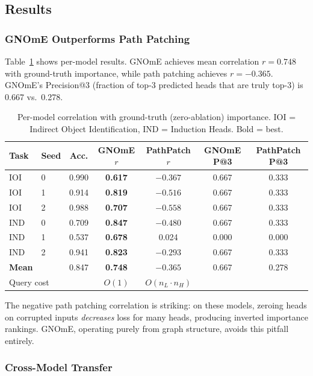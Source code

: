 \documentclass[11pt]{article}
\begin{document}
\subsection{Results}

\subsubsection{GNOmE Outperforms Path Patching}

Table~\ref{tab:main} shows per-model results. GNOmE achieves mean correlation $r = 0.748$ with ground-truth importance, while path patching achieves $r = -0.365$. GNOmE's Precision@3 (fraction of top-3 predicted heads that are truly top-3) is 0.667 vs.\ 0.278.

\begin{table}[t]
\centering
\caption{Per-model correlation with ground-truth (zero-ablation) importance. IOI = Indirect Object Identification, IND = Induction Heads. Bold = best.}
\label{tab:main}
\begin{tabular}{llccccc}
\toprule
Task & Seed & Acc. & GNOmE $r$ & PathPatch $r$ & GNOmE P@3 & PathPatch P@3 \\
\midrule
IOI & 0 & 0.990 & \textbf{0.617} & $-0.367$ & 0.667 & 0.333 \\
IOI & 1 & 0.914 & \textbf{0.819} & $-0.516$ & 0.667 & 0.333 \\
IOI & 2 & 0.988 & \textbf{0.707} & $-0.558$ & 0.667 & 0.333 \\
IND & 0 & 0.709 & \textbf{0.847} & $-0.480$ & 0.667 & 0.333 \\
IND & 1 & 0.537 & \textbf{0.678} & 0.024 & 0.000 & 0.000 \\
IND & 2 & 0.941 & \textbf{0.823} & $-0.293$ & 0.667 & 0.333 \\
\midrule
\textbf{Mean} & & 0.847 & \textbf{0.748} & $-0.365$ & 0.667 & 0.278 \\
\midrule
\multicolumn{3}{l}{Query cost} & $O(1)$ & $O(n_L \cdot n_H)$ & & \\
\bottomrule
\end{tabular}
\end{table}

The negative path patching correlation is striking: on these models, zeroing heads on corrupted inputs \emph{decreases} loss for many heads, producing inverted importance rankings. GNOmE, operating purely from graph structure, avoids this pitfall entirely.

\subsubsection{Cross-Model Transfer}
\end{document}

